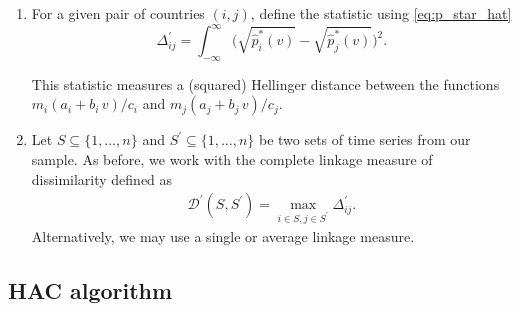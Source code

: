 \documentclass[a4paper,12pt]{article}
\numberwithin{equation}{section}
\begin{document}
\begin{enumerate}[label=\textit{Step \arabic*.},leftmargin=1.45cm]
\item For a given pair of countries $(i, j)$, define the statistic using \eqref{eq:p_star_hat}
$$\Delta_{ij}^\prime = \int_{-\infty}^{\infty} \big( \sqrt{\hat{p}^*_i(v)} - \sqrt{\hat{p}^*_j(v)}\big)^2.$$

This statistic measures a (squared) Hellinger distance between the functions $m_i (a_i + b_i \, v)/c_i$ and $m_j (a_j + b_j\, v)/c_j$.


\item Let $S \subseteq \{1, \ldots, n\}$ and $S^\prime \subseteq \{1, \ldots, n\}$ be two sets of time series from our sample. As before, we work with the complete linkage measure of dissimilarity defined as 
\begin{align*}
\mathcal{D}^\prime (S, S^\prime) = \max_{i \in S, j\in S^\prime} \Delta^\prime_{ij}.
\end{align*}
Alternatively, we may use a single or average linkage measure. 


\end{enumerate}



\subsection{HAC algorithm}\label{sec:alg}
\end{document}
